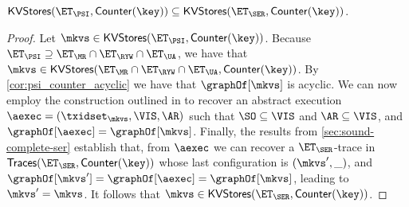\begin{corollary}
$\mathsf{KVStores}(\ET_{\PSI}, \mathsf{Counter}(\key)) \subseteq \mathsf{KVStores}(\ET_{\SER}, \mathsf{Counter}(\key))$. 
\end{corollary}

\begin{proof}
Let $\mkvs \in \mathsf{KVStores}(\ET_{\PSI}, \mathsf{Counter}(\key))$. Because $\ET_{\PSI} \supseteq \ET_{\MR} \cap \ET_{\RYW} \cap \ET_{\UA}$, 
we have that $\mkvs \in \mathsf{KVStores}(\ET_{\MR} \cap \ET_{\RYW} \cap \ET_{\UA}, \mathsf{Counter}(\key))$. 
By \cref{cor:psi_counter_acyclic} we have that $\graphOf[\mkvs]$ is acyclic. We can now employ the construction 
outlined in \cite{laws} to recover an abstract execution $\aexec = (\txidset_{\mkvs}, \VIS, \AR)$ such that $\SO \subseteq \VIS$ and $\AR \subseteq \VIS$, 
and $\graphOf[\aexec] = \graphOf[\mkvs]$.
Finally, the results from \cref{sec:sound-complete-ser} establish that, from $\aexec$ we can recover a $\ET_{\SER}$-trace in 
$\mathsf{Traces}(\ET_{\SER}, \mathsf{Counter}(\key))$ 
whose last configuration is $(\mkvs', \_)$, and 
$\graphOf[\mkvs'] = \graphOf[\aexec] = \graphOf[\mkvs]$, leading to $\mkvs' = \mkvs$. It follows that $\mkvs \in 
\mathsf{KVStores}(\ET_{\SER}, \mathsf{Counter}(\key))$.
\end{proof}

 
